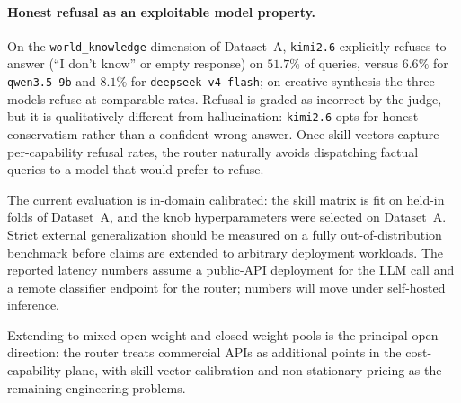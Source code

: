 \documentclass[twocolumn,10pt,a4paper]{article}
\begin{document}
\paragraph{Honest refusal as an exploitable model property.} On the \texttt{world\_knowledge} dimension of Dataset~A, \texttt{kimi2.6} explicitly refuses to answer (``I don't know'' or empty response) on $51.7\%$ of queries, versus $6.6\%$ for \texttt{qwen3.5-9b} and $8.1\%$ for \texttt{deepseek-v4-flash}; on creative-synthesis the three models refuse at comparable rates. Refusal is graded as incorrect by the judge, but it is qualitatively different from hallucination: \texttt{kimi2.6} opts for honest conservatism rather than a confident wrong answer. Once skill vectors capture per-capability refusal rates, the router naturally avoids dispatching factual queries to a model that would prefer to refuse.

The current evaluation is in-domain calibrated: the skill matrix is fit on held-in folds of Dataset~A, and the knob hyperparameters were selected on Dataset~A. Strict external generalization should be measured on a fully out-of-distribution benchmark before claims are extended to arbitrary deployment workloads. The reported latency numbers assume a public-API deployment for the LLM call and a remote classifier endpoint for the router; numbers will move under self-hosted inference.

Extending to mixed open-weight and closed-weight pools is the principal open direction: the router treats commercial APIs as additional points in the cost-capability plane, with skill-vector calibration and non-stationary pricing as the remaining engineering problems.
\end{document}
